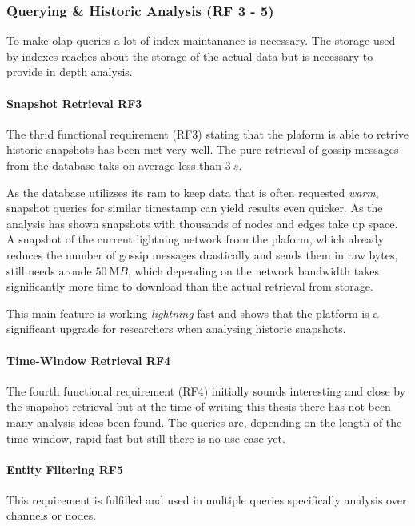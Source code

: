 \subsubsection{Querying \& Historic Analysis (RF 3 - 5)}
To make \gls{olap} queries a lot of index maintanance is necessary.
The storage used by indexes reaches about the storage of the actual data
but is necessary to provide in depth analysis.

\paragraph{Snapshot Retrieval RF3}
The thrid functional requirement (RF3) stating that the plaform is able to retrive 
historic snapshots has been met very well. 
The pure retrieval of gossip messages from the database 
taks on average less than $\qty{3}{s}$. 

As the database utilizses its \gls{ram} to keep data that is often requested \textit{warm},
snapshot queries for similar timestamp can yield results even quicker.
As the analysis has shown snapshots with thousands of nodes and edges take up space.
A snapshot of the current lightning network from the  plaform,
which already reduces the number of gossip messages drastically and sends them in raw bytes,
still needs aroude $\qty{50}{\mega B}$, which depending on the network bandwidth
takes significantly more time to download than the actual retrieval from storage.

This main feature is working \textit{lightning} fast and shows that the 
platform is a significant upgrade for researchers when analysing historic snapshots.

\paragraph{Time-Window Retrieval RF4}
The fourth functional requirement (RF4) initially sounds interesting and close by
the snapshot retrieval but at the time of writing this thesis there has not been
many analysis ideas been found. 
The queries are, depending on the length of the time window,
rapid fast but still there is no use case yet.

\paragraph{Entity Filtering RF5}
This requirement is fulfilled and used in multiple queries specifically analysis
over channels or nodes.


